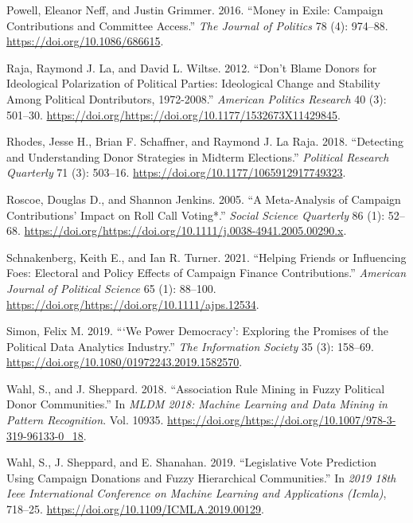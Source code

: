 \documentclass[12pt,]{article}
\begin{document}
\leavevmode\hypertarget{ref-powell2016}{}%
Powell, Eleanor Neff, and Justin Grimmer. 2016. ``Money in Exile:
Campaign Contributions and Committee Access.'' \emph{The Journal of
Politics} 78 (4): 974--88. \url{https://doi.org/10.1086/686615}.

\leavevmode\hypertarget{ref-laraja2012}{}%
Raja, Raymond J. La, and David L. Wiltse. 2012. ``Don't Blame Donors for
Ideological Polarization of Political Parties: Ideological Change and
Stability Among Political Dontributors, 1972-2008.'' \emph{American
Politics Research} 40 (3): 501--30.
\url{https://doi.org/https://doi.org/10.1177/1532673X11429845}.

\leavevmode\hypertarget{ref-rhodes2018}{}%
Rhodes, Jesse H., Brian F. Schaffner, and Raymond J. La Raja. 2018.
``Detecting and Understanding Donor Strategies in Midterm Elections.''
\emph{Political Research Quarterly} 71 (3): 503--16.
\url{https://doi.org/10.1177/1065912917749323}.

\leavevmode\hypertarget{ref-roscoe2005}{}%
Roscoe, Douglas D., and Shannon Jenkins. 2005. ``A Meta-Analysis of
Campaign Contributions' Impact on Roll Call Voting*.'' \emph{Social
Science Quarterly} 86 (1): 52--68.
\url{https://doi.org/https://doi.org/10.1111/j.0038-4941.2005.00290.x}.

\leavevmode\hypertarget{ref-schnakenberg2021}{}%
Schnakenberg, Keith E., and Ian R. Turner. 2021. ``Helping Friends or
Influencing Foes: Electoral and Policy Effects of Campaign Finance
Contributions.'' \emph{American Journal of Political Science} 65 (1):
88--100. \url{https://doi.org/https://doi.org/10.1111/ajps.12534}.

\leavevmode\hypertarget{ref-simon2019}{}%
Simon, Felix M. 2019. ```We Power Democracy': Exploring the Promises of
the Political Data Analytics Industry.'' \emph{The Information Society}
35 (3): 158--69. \url{https://doi.org/10.1080/01972243.2019.1582570}.

\leavevmode\hypertarget{ref-wahl2018}{}%
Wahl, S., and J. Sheppard. 2018. ``Association Rule Mining in Fuzzy
Political Donor Communities.'' In \emph{MLDM 2018: Machine Learning and
Data Mining in Pattern Recognition}. Vol. 10935.
\url{https://doi.org/https://doi.org/10.1007/978-3-319-96133-0_18}.

\leavevmode\hypertarget{ref-wahl2019}{}%
Wahl, S., J. Sheppard, and E. Shanahan. 2019. ``Legislative Vote
Prediction Using Campaign Donations and Fuzzy Hierarchical
Communities.'' In \emph{2019 18th Ieee International Conference on
Machine Learning and Applications (Icmla)}, 718--25.
\url{https://doi.org/10.1109/ICMLA.2019.00129}.
\end{document}
